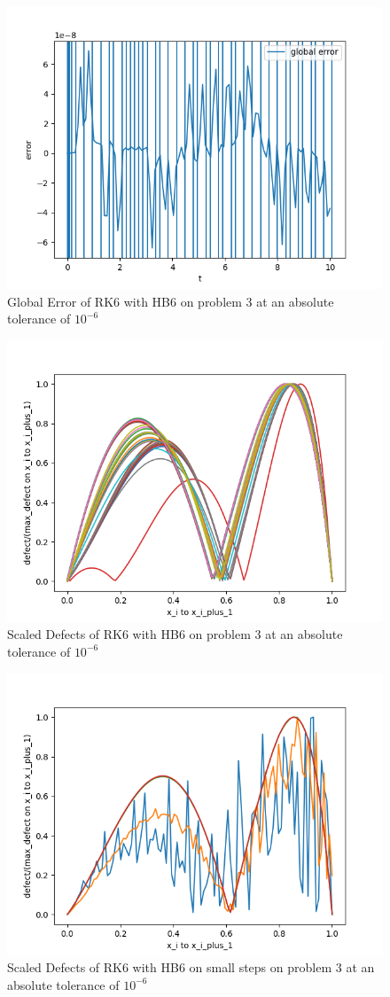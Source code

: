 \documentclass{article}
\begin{document}
\begin{figure}[H]
\centering
\includegraphics[width=0.7\linewidth]{./figures/rk6_with_hb6_p3_global_error}
\caption{Global Error of RK6 with HB6 on problem 3 at an absolute tolerance of $10^{-6}$}
\label{fig:rk6_with_hb6_p3_global_error}
\end{figure}

\begin{figure}[H]
\centering
\includegraphics[width=0.7\linewidth]{./figures/rk6_with_hb6_p3_scaled_defects}
\caption{Scaled Defects of RK6 with HB6 on problem 3 at an absolute tolerance of $10^{-6}$}
\label{fig:rk6_with_hb6_p3_scaled_defects}
\end{figure}

\begin{figure}[H]
\centering
\includegraphics[width=0.7\linewidth]{./figures/rk6_with_hb6_p3_scaled_defects_small_steps}
\caption{Scaled Defects of RK6 with HB6 on small steps on problem 3 at an absolute tolerance of $10^{-6}$}
\label{fig:rk6_with_hb6_p3_scaled_defects_small_steps}
\end{figure}
\end{document}

